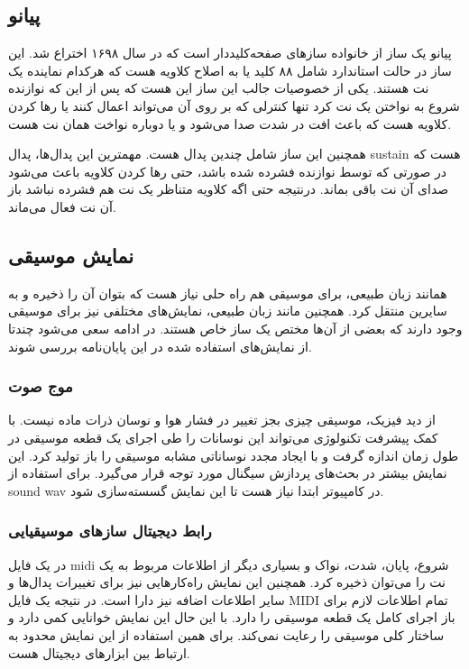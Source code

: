 \subsection{پیانو}
پیانو یک ساز از خانواده ساز‌های صفحه‌کلیددار است که در سال ۱۶۹۸ اختراع شد. این
ساز در حالت استاندارد شامل ۸۸ کلید یا به اصلاح کلاویه هست که هرکدام نماینده یک
نت هستند. یکی از خصوصیات جالب این ساز این هست که پس از این که نوازنده شروع به
نواختن یک نت کرد تنها کنترلی که بر روی آن می‌تواند اعمال کنند یا رها کردن کلاویه
هست که باعث افت در شدت صدا می‌شود و یا دوباره نواخت همان نت هست.

همچنین این ساز شامل چندین پدال هست. مهمترین این پدال‌ها، پدال \gls{sustain} هست
که در صورتی که توسط نوازنده فشرده شده باشد، حتی رها کردن کلاویه باعث می‌شود صدای
آن نت باقی بماند. درنتیجه حتی اگه کلاویه متناظر یک نت هم فشرده نباشد باز آن نت
فعال می‌ماند.

\subsection{نمایش موسیقی}
همانند زبان طبیعی، برای موسیقی هم راه حلی نیاز هست که بتوان آن را ذخیره و به
سایرین منتقل کرد. همچنین مانند زبان طبیعی، نمایش‌های مختلفی نیز برای موسیقی وجود
دارند که بعضی‌ از آن‌ها مختص یک ساز خاص هستند. در ادامه سعی می‌شود چندتا از
نمایش‌های استفاده شده در این پایان‌نامه بررسی شوند.

\subsubsection{موج صوت}
از دید فیزیک، موسیقی چیزی بجز تغییر در فشار هوا و نوسان ذرات ماده نیست. با کمک
پیشرفت تکنولوژی می‌تواند این نوسانات را طی اجرای یک قطعه موسیقی در طول زمان
اندازه گرفت و با ایجاد مجدد نوساناتی مشابه موسیقی را باز تولید کرد. این نمایش
بیشتر در بحث‌های پردازش سیگنال مورد توجه قرار می‌گیرد. برای استفاده از
\gls{sound wav} در کامپیوتر ابتدا نیاز هست تا این نمایش گسسته‌سازی شود.

\subsubsection{رابط دیجیتال سازهای موسیقیایی}
در یک فایل \gls{midi} شروع، پایان، شدت، نواک و بسیاری دیگر از اطلاعات مربوط به
یک نت را می‌توان ذخیره کرد. همچنین این نمایش راه‌کارهایی نیز برای تغییرات
پدال‌ها و سایر اطلاعات اضافه نیز دارا است. در نتیجه یک فایل \gls{MIDI} تمام
اطلاعات لازم برای باز اجرای کامل یک قطعه موسیقی را دارد. با این حال این
نمایش خوانایی کمی‌ دارد و ساختار کلی موسیقی را رعایت نمی‌کند. برای همین استفاده
از این نمایش محدود به ارتباط بین ابزارهای دیجیتال هست.


